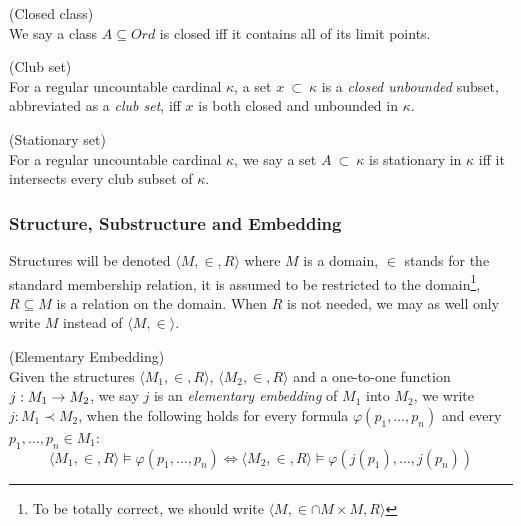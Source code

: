 \begin{definition}{(Closed class)}\label{def:closed_class}\\
We say a class $A \subseteq Ord$ is closed iff it contains all of its limit points.
\end{definition}

\begin{definition}{(Club set)}\label{def:club_set}\\
For a regular uncountable cardinal $\kappa$, a set $x\ \subset\ \kappa$ is a \emph{closed unbounded} subset, abbreviated as a \emph{club set}, iff $x$ is both closed and unbounded in $\kappa$.
\end{definition}

\begin{definition}{(Stationary set)}\label{def:stationary_set}\\
For a regular uncountable cardinal $\kappa$, we say a set $A\ \subset\ \kappa$ is stationary in $\kappa$ iff it intersects every club subset of $\kappa$.
\end{definition}

\subsubsection{Structure, Substructure and Embedding}

Structures will be denoted $\langle M, \in, R \rangle$ where $M$ is a domain, $\in$ stands for the standard membership relation, it is assumed to be restricted to the domain\footnote{To be totally correct, we should write $\langle M, \in \cap M \times M, R \rangle$}, $R \subseteq M$ is a relation on the domain. When $R$ is not needed, we may as well only write $M$ instead of $\langle M, \in \rangle$.

\begin{definition}{(Elementary Embedding)}\label{def:elementary_embedding}\\
Given the structures $\langle M_1, \in, R \rangle$, $\langle M_2, \in, R \rangle$ and a one-to-one function $j: M_1 \rightarrow M_2$, we say $j$ is an \emph{elementary embedding} of $M_1$ into $M_2$, we write $j: M_1 \prec M_2$, when the following holds for every formula $\varphi(p_1, \ldots, p_n)$ and every $p_1, \ldots, p_n \in M_1$:
\begin{equation}
\langle M_1, \in, R \rangle \models \varphi(p_1, \ldots, p_n) \iff \langle M_2, \in, R \rangle  \models \varphi(j(p_1), \ldots, j(p_n))
\end{equation}
\end{definition}


